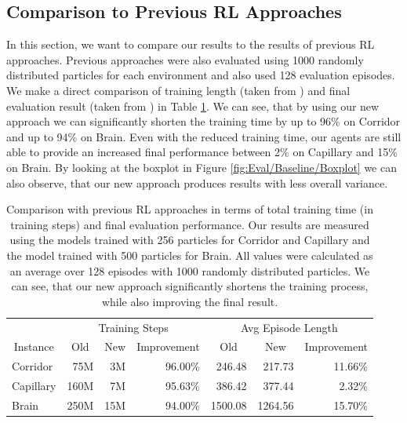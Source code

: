 \subsection{Comparison to Previous RL Approaches} \label{sec:EvalRLComparison}
In this section, we want to compare our results to the results of previous RL approaches. Previous approaches were also evaluated using 1000 randomly distributed particles for each environment and also used 128 evaluation episodes. We make a direct comparison of training length (taken from \cite{huang2019}) and final evaluation result (taken from \cite{becker2020}) in Table \ref{tab:Eval/PreviousRLApproach}. We can see, that by using our new approach we can significantly shorten the training time by up to 96\% on Corridor and up to 94\% on Brain. Even with the reduced training time, our agents are still able to provide an increased final performance between 2\% on Capillary and 15\% on Brain. By looking at the boxplot in Figure \ref{fig:Eval/Baseline/Boxplot} we can also observe, that our new approach produces results with less overall variance. 

\begin{table}[htp]
    \begin{center}
        \begin{tabular}{lrrrrrr}
            \toprule
            & \multicolumn{3}{c}{Training Steps} & \multicolumn{3}{c}{Avg Episode Length} \\
            \cmidrule(lr){2-4} \cmidrule(lr){5-7}
            \multicolumn{1}{c}{Instance} & \multicolumn{1}{c}{Old} & \multicolumn{1}{c}{New} & \multicolumn{1}{c}{Improvement} & \multicolumn{1}{c}{Old} & \multicolumn{1}{c}{New} & \multicolumn{1}{c}{Improvement} \\
            \midrule
            Corridor & 75M & 3M & 96.00\% & 246.48 & 217.73 & 11.66\% \\
            Capillary & 160M & 7M & 95.63\% & 386.42 & 377.44 & 2.32\% \\
            Brain & 250M & 15M & 94.00\% & 1500.08 & 1264.56 & 15.70\% \\
            \bottomrule
        \end{tabular}

    \end{center}
    \caption[Comparison with Previous RL Approaches]{Comparison with previous RL approaches in terms of total training time (in training steps) and final evaluation performance. Our results are measured using the models trained with 256 particles for Corridor and Capillary and the model trained with 500 particles for Brain. All values were calculated as an average over 128 episodes with 1000 randomly distributed particles. We can see, that our new approach significantly shortens the training process, while also improving the final result.} \label{tab:Eval/PreviousRLApproach}
\end{table}

